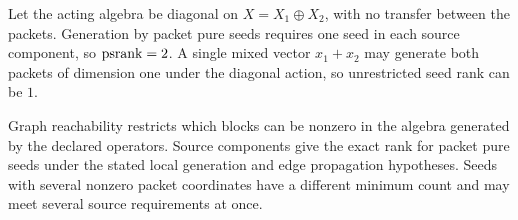 \begin{microexample}[title={Why mixed seeds change the answer}]
Let the acting algebra be diagonal on \(X=X_1\oplus X_2\), with no transfer between the packets.  Generation by packet pure seeds requires one seed in each source component, so \(\operatorname{psrank}=2\).  A single mixed vector \(x_1+x_2\) may generate both packets of dimension one under the diagonal action, so unrestricted seed rank can be \(1\).
\end{microexample}

\begin{sectionrecap}
Graph reachability restricts which blocks can be nonzero in the algebra generated by the declared operators.  Source components give the exact rank for packet pure seeds under the stated local generation and edge propagation hypotheses.  Seeds with several nonzero packet coordinates have a different minimum count and may meet several source requirements at once.
\end{sectionrecap}


